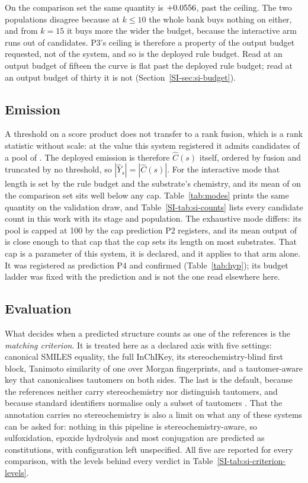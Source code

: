 

On the comparison set the same quantity is $+0.0556$, past the ceiling. The two
populations disagree because at $k \le 10$ the whole bank
buys nothing on either, and from $k=15$ it buys more the wider the budget, because the
interactive arm runs out of candidates. P3's ceiling is therefore a property of the output budget
requested, not of the system, and so is the deployed rule budget. Read at an output budget of fifteen the curve is flat past the deployed rule budget; read at an output budget of thirty it is not (Section~\ref{SI-sec:si-budget}).

\subsection{Emission}

A threshold on a score product does not transfer to a rank fusion, which is a rank statistic without scale: at the value this system registered it admits \numEmitByfusion{} candidates of a pool of \numEmitPool{}. The deployed emission is therefore $\hat{C}(s)$ itself, ordered by fusion and truncated by no
threshold, so $|\hat{Y}_s| = |\hat{C}(s)|$. For the interactive mode that length is set by the
rule budget and the substrate's chemistry, and its mean of \numEmittedTrained{} on the comparison
set sits well below any cap. Table~\ref{tab:modes} prints the same quantity on the validation draw, and Table~\ref{SI-tab:si-counts} lists every candidate count in this work with its stage and population. The exhaustive mode differs: its pool is capped at 100 by the cap prediction P2 registers, and
its mean output of \numEmittedBank{} is close enough to that cap that the cap sets its length on
most substrates. That cap is a parameter of this system, it is declared, and it applies to that
arm alone. It was registered as prediction P4 and confirmed (Table~\ref{tab:hyp}); its budget ladder was fixed with the prediction and is not the one read elsewhere here.

\subsection{Evaluation}
\label{sec:evaluation}

What decides when a predicted structure counts as one of the references is the
\emph{matching criterion}. It is treated here as a declared axis with five settings: canonical
SMILES equality, the full InChIKey, its stereochemistry-blind first block, Tanimoto similarity of
one over Morgan fingerprints, and a tautomer-aware key that canonicalises tautomers on both
sides. The last is the
default, because the references neither carry stereochemistry nor distinguish tautomers, and
because standard identifiers normalise only a subset of tautomers \citep{Dhaked_2020}. That the
annotation carries no stereochemistry is also a limit on what any of these systems can be asked
for: nothing in this pipeline is stereochemistry-aware, so sulfoxidation, epoxide hydrolysis and
most conjugation are predicted as constitutions, with configuration left unspecified. All five are reported for every
comparison, with the levels behind every verdict in Table~\ref{SI-tab:si-criterion-levels}.

